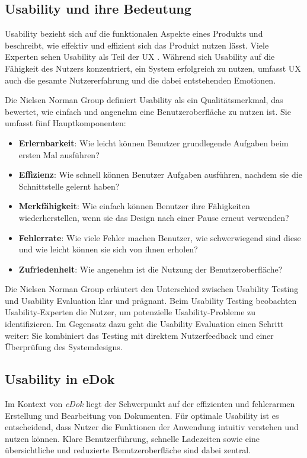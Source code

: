 \documentclass[12pt,oneside]{article}
\begin{document}
\subsection{Usability und ihre Bedeutung}

Usability bezieht sich auf die funktionalen Aspekte eines Produkts und beschreibt, wie effektiv und effizient sich das Produkt nutzen lässt. Viele Experten sehen Usability als Teil der UX \cite{GOISTAI}. Während sich Usability auf die Fähigkeit des Nutzers konzentriert, ein System erfolgreich zu nutzen, umfasst UX auch die gesamte Nutzererfahrung und die dabei entstehenden Emotionen.

Die Nielsen Norman Group definiert Usability als ein Qualitätsmerkmal, das bewertet, wie einfach und angenehm eine Benutzeroberfläche zu nutzen ist. Sie umfasst fünf Hauptkomponenten:

\begin{itemize} \item \textbf{Erlernbarkeit}: Wie leicht können Benutzer grundlegende Aufgaben beim ersten Mal ausführen? \item \textbf{Effizienz}: Wie schnell können Benutzer Aufgaben ausführen, nachdem sie die Schnittstelle gelernt haben? \item \textbf{Merkfähigkeit}: Wie einfach können Benutzer ihre Fähigkeiten wiederherstellen, wenn sie das Design nach einer Pause erneut verwenden? \item \textbf{Fehlerrate}: Wie viele Fehler machen Benutzer, wie schwerwiegend sind diese und wie leicht können sie sich von ihnen erholen? \item \textbf{Zufriedenheit}: Wie angenehm ist die Nutzung der Benutzeroberfläche? \end{itemize}
Die Nielsen Norman Group erläutert den Unterschied zwischen Usability Testing und Usability Evaluation klar und prägnant. Beim Usability Testing beobachten Usability-Experten die Nutzer, um potenzielle Usability-Probleme zu identifizieren. Im Gegensatz dazu geht die Usability Evaluation einen Schritt weiter: Sie kombiniert das Testing mit direktem Nutzerfeedback und einer Überprüfung des Systemdesigns.
\subsection{Usability in eDok}

Im Kontext von \textit{eDok} liegt der Schwerpunkt auf der effizienten und fehlerarmen Erstellung und Bearbeitung von Dokumenten. Für optimale Usability ist es entscheidend, dass Nutzer die Funktionen der Anwendung intuitiv verstehen und nutzen können. Klare Benutzerführung, schnelle Ladezeiten sowie eine übersichtliche und reduzierte Benutzeroberfläche sind dabei zentral.
\end{document}
